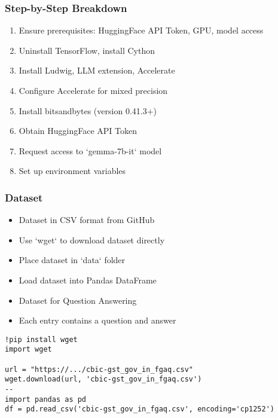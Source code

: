 \begin{frame}[fragile]\frametitle{Step-by-Step Breakdown}
\begin{enumerate}
\item Ensure prerequisites: HuggingFace API Token, GPU, model access
\item Uninstall TensorFlow, install Cython
\item Install Ludwig, LLM extension, Accelerate
\item Configure Accelerate for mixed precision
\item Install bitsandbytes (version 0.41.3+)
\item Obtain HuggingFace API Token
\item Request access to `gemma-7b-it` model
\item Set up environment variables
\end{enumerate}
\end{frame}


\begin{frame}[fragile]\frametitle{Dataset}
\begin{itemize}
\item Dataset in CSV format from GitHub
\item Use `wget` to download dataset directly
\item Place dataset in `data` folder
\item Load dataset into Pandas DataFrame
\item Dataset for Question Answering
\item Each entry contains a question and answer
\end{itemize}


\begin{lstlisting}
!pip install wget
import wget

url = "https://.../cbic-gst_gov_in_fgaq.csv"
wget.download(url, 'cbic-gst_gov_in_fgaq.csv')
--
import pandas as pd
df = pd.read_csv('cbic-gst_gov_in_fgaq.csv', encoding='cp1252')
\end{lstlisting}
\end{frame}

